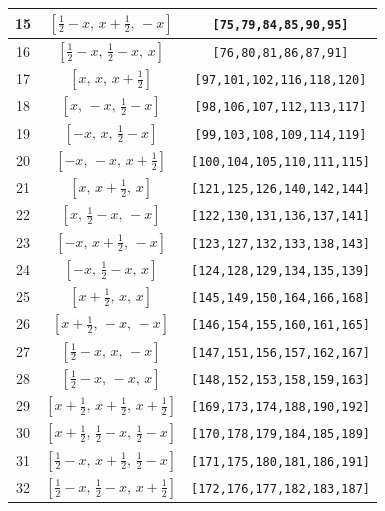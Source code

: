 \documentclass[fleqn,8pt]{jsarticle}
\begin{document}
\begin{longtable}{ccc}
15 & $\left[ \frac{1}{2} - x,\, x + \frac{1}{2},\, - x \right]$ & {\tt [75,79,84,85,90,95]} \\ \hline
16 & $\left[ \frac{1}{2} - x,\, \frac{1}{2} - x,\, x \right]$ & {\tt [76,80,81,86,87,91]} \\ \hline
17 & $\left[ x,\, x,\, x + \frac{1}{2} \right]$ & {\tt [97,101,102,116,118,120]} \\ \hline
18 & $\left[ x,\, - x,\, \frac{1}{2} - x \right]$ & {\tt [98,106,107,112,113,117]} \\ \hline
19 & $\left[ - x,\, x,\, \frac{1}{2} - x \right]$ & {\tt [99,103,108,109,114,119]} \\ \hline
20 & $\left[ - x,\, - x,\, x + \frac{1}{2} \right]$ & {\tt [100,104,105,110,111,115]} \\ \hline
21 & $\left[ x,\, x + \frac{1}{2},\, x \right]$ & {\tt [121,125,126,140,142,144]} \\ \hline
22 & $\left[ x,\, \frac{1}{2} - x,\, - x \right]$ & {\tt [122,130,131,136,137,141]} \\ \hline
23 & $\left[ - x,\, x + \frac{1}{2},\, - x \right]$ & {\tt [123,127,132,133,138,143]} \\ \hline
24 & $\left[ - x,\, \frac{1}{2} - x,\, x \right]$ & {\tt [124,128,129,134,135,139]} \\ \hline
25 & $\left[ x + \frac{1}{2},\, x,\, x \right]$ & {\tt [145,149,150,164,166,168]} \\ \hline
26 & $\left[ x + \frac{1}{2},\, - x,\, - x \right]$ & {\tt [146,154,155,160,161,165]} \\ \hline
27 & $\left[ \frac{1}{2} - x,\, x,\, - x \right]$ & {\tt [147,151,156,157,162,167]} \\ \hline
28 & $\left[ \frac{1}{2} - x,\, - x,\, x \right]$ & {\tt [148,152,153,158,159,163]} \\ \hline
29 & $\left[ x + \frac{1}{2},\, x + \frac{1}{2},\, x + \frac{1}{2} \right]$ & {\tt [169,173,174,188,190,192]} \\ \hline
30 & $\left[ x + \frac{1}{2},\, \frac{1}{2} - x,\, \frac{1}{2} - x \right]$ & {\tt [170,178,179,184,185,189]} \\ \hline
31 & $\left[ \frac{1}{2} - x,\, x + \frac{1}{2},\, \frac{1}{2} - x \right]$ & {\tt [171,175,180,181,186,191]} \\ \hline
32 & $\left[ \frac{1}{2} - x,\, \frac{1}{2} - x,\, x + \frac{1}{2} \right]$ & {\tt [172,176,177,182,183,187]} \\
\end{longtable}
\renewcommand{\arraystretch}{1.2}
\end{document}
